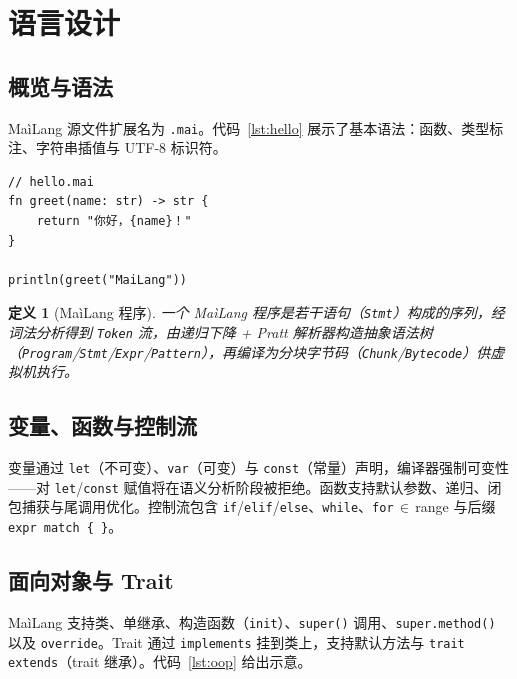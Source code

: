 \documentclass[10pt,a4paper]{article}
\newtheorem{definition}{定义}
\begin{document}
\section{语言设计}
\label{sec:language}

\subsection{概览与语法}

MaìLang 源文件扩展名为 \texttt{.mai}。代码~\ref{lst:hello} 展示了基本语法：函数、类型标注、字符串插值与 UTF-8 标识符。

\begin{lstlisting}[language={},caption={MaìLang 基本语法示例},label={lst:hello},float]
// hello.mai
fn greet(name: str) -> str {
    return "你好，{name}！"
}

println(greet("MaiLang"))
\end{lstlisting}

\begin{definition}[MaìLang 程序]
一个 MaìLang 程序是若干语句（\texttt{Stmt}）构成的序列，经词法分析得到 \texttt{Token} 流，由递归下降 + Pratt 解析器构造抽象语法树（\texttt{Program}/\texttt{Stmt}/\texttt{Expr}/\texttt{Pattern}），再编译为分块字节码（\texttt{Chunk}/\texttt{Bytecode}）供虚拟机执行。
\end{definition}

\subsection{变量、函数与控制流}

变量通过 \texttt{let}（不可变）、\texttt{var}（可变）与 \texttt{const}（常量）声明，编译器强制可变性——对 \texttt{let}/\texttt{const} 赋值将在语义分析阶段被拒绝。函数支持默认参数、递归、闭包捕获与尾调用优化。控制流包含 \texttt{if}/\texttt{elif}/\texttt{else}、\texttt{while}、\texttt{for}\,$\in$\,range 与后缀 \texttt{expr match \{ \}}。

\subsection{面向对象与 Trait}

MaìLang 支持类、单继承、构造函数（\texttt{init}）、\texttt{super()} 调用、\texttt{super.method()} 以及 \texttt{override}。Trait 通过 \texttt{implements} 挂到类上，支持默认方法与 \texttt{trait extends}（trait 继承）。代码~\ref{lst:oop} 给出示意。
\end{document}
